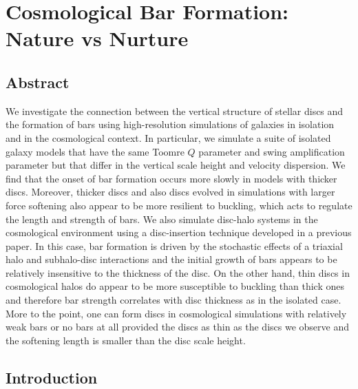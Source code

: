 
\chapter{Cosmological Bar Formation: Nature vs Nurture}


\section{Abstract}

We investigate the connection between the vertical structure of
stellar discs and the formation of bars using high-resolution
simulations of galaxies in isolation and in the cosmological context.
In particular, we simulate a suite of isolated galaxy models that have
the same Toomre $Q$ parameter and swing amplification parameter but
that differ in the vertical scale height and velocity dispersion.  We
find that the onset of bar formation occurs more slowly in models with
thicker discs.  Moreover, thicker discs and also discs evolved in
simulations with larger force softening also appear to be more
resilient to buckling, which acts to regulate the length and strength
of bars.  We also simulate disc-halo systems in the cosmological
environment using a disc-insertion technique developed in a previous
paper.  In this case, bar formation is driven by the stochastic
effects of a triaxial halo and subhalo-disc interactions and the
initial growth of bars appears to be relatively insensitive to the
thickness of the disc.  On the other hand, thin discs in cosmological
halos do appear to be more susceptible to buckling than thick ones and
therefore bar strength correlates with disc thickness as in the
isolated case.  More to the point, one can form discs in cosmological
simulations with relatively weak bars or no bars at all provided the
discs as thin as the discs we observe and the softening length is
smaller than the disc scale height.


\section{Introduction}

